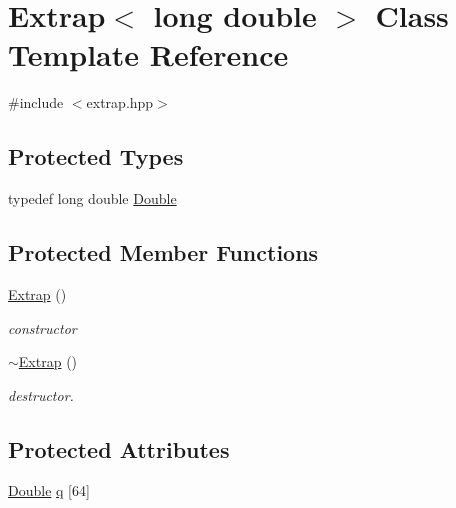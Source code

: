 \hypertarget{classExtrap_3_01long_01double_01_4}{\section{Extrap$<$ long double $>$ Class Template Reference}
\label{classExtrap_3_01long_01double_01_4}
}


{\ttfamily \#include $<$extrap.\-hpp$>$}

\subsection*{Protected Types}
\begin{DoxyCompactItemize}
\item 
typedef long double \hyperlink{classExtrap_3_01long_01double_01_4_aed4aaf89addd958ffad04c5780c84954}{Double}
\end{DoxyCompactItemize}
\subsection*{Protected Member Functions}
\begin{DoxyCompactItemize}
\item 
\hyperlink{classExtrap_3_01long_01double_01_4_a200f8892a52db53dd763dc4a0e5cae6e}{Extrap} ()
\begin{DoxyCompactList}\small\item\em constructor \end{DoxyCompactList}\item 
\hyperlink{classExtrap_3_01long_01double_01_4_a7389d51335829db372bf38bb6e936b75}{$\sim$\-Extrap} ()
\begin{DoxyCompactList}\small\item\em destructor. \end{DoxyCompactList}\end{DoxyCompactItemize}
\subsection*{Protected Attributes}
\begin{DoxyCompactItemize}
\item 
\hyperlink{classExtrap_3_01long_01double_01_4_aed4aaf89addd958ffad04c5780c84954}{Double} \hyperlink{classExtrap_3_01long_01double_01_4_abc85e0bb8c91a709fea22f44a85195d6}{q} \mbox{[}64\mbox{]}
\end{DoxyCompactItemize}


